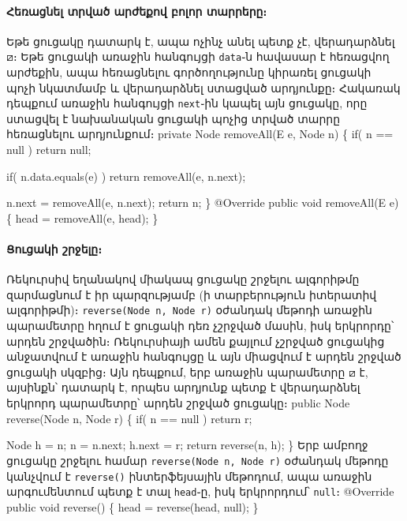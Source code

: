 \paragraph{Հեռացնել տրված արժեքով բոլոր տարրերը։}
Եթե ցուցակը դատարկ է, ապա ոչինչ անել պետք չէ, վերադարձնել 
\(\boxslash\)։ Եթե ցուցակի առաջին հանգույցի \texttt{data}֊ն
հավասար է հեռացվող արժեքին, ապա հեռացնելու գործողությունը
կիրառել ցուցակի պոչի նկատմամբ և վերադարձնել ստացված արդյունքը։
Հակառակ դեպքում առաջին հանգույցի \texttt{next}֊ին կապել 
այն ցուցակը, որը ստացվել է նախանական ցուցակի պոչից տրված 
տարրը հեռացնելու արդյունքում։
\nwenddocs{}\endmoddef{}
private Node removeAll(E e, Node n)
\{
  if( n == null )
    return null;

  if( n.data.equals(e) )
    return removeAll(e, n.next);

  n.next = removeAll(e, n.next);
  return n;
\}
@Override
public void removeAll(E e)
\{
  head = removeAll(e, head);
\}
\nwendcode{}\nwdocspar


%
%
\paragraph{Ցուցակի շրջելը։}
Ռեկուրսիվ եղանակով միակապ ցուցակը շրջելու ալգորիթմը զարմացնում 
է իր պարզությամբ (ի տարբերություն իտերատիվ ալգորիթմի)։ 
\texttt{reverse(Node n, Node r)} օժանդակ մեթոդի առաջին 
պարամետրը հղում է ցուցակի դեռ չշրջված մասին, իսկ երկրորդը՝
արդեն շրջվածին։ Ռեկուրսիայի ամեն քայլում չշրջված ցուցակից
անջատվում է առաջին հանգույցը և այն միացվում է արդեն շրջված
ցուցակի սկզբից։ Այն դեպքում, երբ առաջին պարամետրը \(\boxslash\)
է, այսինքն՝ դատարկ է, որպես արդյունք պետք է վերադարձնել 
երկրորդ պարամետրը՝ արդեն շրջված ցուցակը։   
\nwenddocs{}\endmoddef{}
public Node reverse(Node n, Node r)
\{
  if( n == null )
    return r;

  Node h = n; 
  n = n.next; 
  h.next = r;
  return reverse(n, h);
\}
\nwendcode{}\nwdocspar
\nwenddocs{}Երբ ամբողջ ցուցակը շրջելու համար \texttt{reverse(Node n, Node r)} 
օժանդակ մեթոդը կանչվում է \texttt{reverse()} ինտերֆեյսային մեթոդում,
ապա առաջին արգումենտում պետք է տալ \texttt{head}֊ը, իսկ երկրորդում՝
\texttt{null}։
\nwenddocs{}\plusendmoddef
@Override
public void reverse()
\{
  head = reverse(head, null);
\}
\nwendcode{}\nwdocspar



